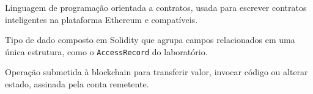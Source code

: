 \begin{description}[
  font=\normalfont\bfseries,
  style=multiline,
  leftmargin=5.6cm,
  labelwidth=4.9cm,
  labelsep=0.35cm,
  itemsep=0.55\baselineskip
]
  \item[Solidity] Linguagem de programação orientada a contratos, usada para escrever contratos inteligentes na plataforma Ethereum e compatíveis.
  \item[Struct] Tipo de dado composto em Solidity que agrupa campos relacionados em uma única estrutura, como o \texttt{AccessRecord} do laboratório.
  \item[Transação] Operação submetida à blockchain para transferir valor, invocar código ou alterar estado, assinada pela conta remetente.
\end{description}
